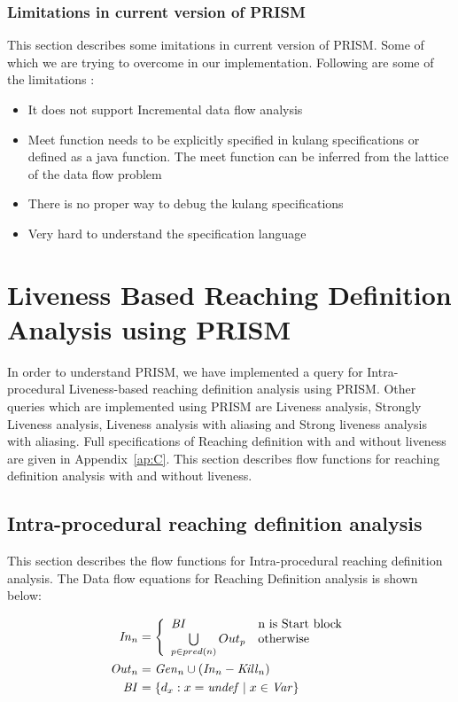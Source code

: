 \documentclass[11pt,a4paper,openright]{report}
\begin{document}
\subsection{Limitations in current version of PRISM}
This section describes some imitations in current version of PRISM. Some of which we are trying to overcome in our implementation.
Following are some of the limitations :
\begin{itemize}
 \item It does not support Incremental data flow analysis
 \item Meet function needs to be explicitly specified in kulang specifications or defined as a java function. The meet function can be inferred from
the lattice of the data flow problem
\item There is no proper way to debug the kulang specifications
 \item Very hard to understand the specification language

\end{itemize}

\chapter{Liveness Based Reaching Definition Analysis using PRISM}

In order to understand PRISM, we have implemented a query for Intra-procedural Liveness-based reaching definition analysis using PRISM. Other queries which are 
implemented using PRISM are Liveness analysis, Strongly Liveness analysis, Liveness analysis with aliasing and Strong liveness analysis with aliasing.
Full specifications of Reaching definition with and without liveness are given in Appendix~\ref{ap:C}. This section describes flow functions for reaching definition analysis with and without
liveness.

\section{Intra-procedural reaching definition analysis}
This section describes the flow functions for Intra-procedural reaching definition analysis.
The Data flow equations for Reaching Definition analysis is shown below:

\begin{equation}
\begin{split}
\mbox{\textit{In}}_n &= \left\{ \begin{array}{ll}
	  \mbox{\textit{BI}} & \mbox{n is Start block}\\
	  \bigcup\limits_{p \in pred(n)} Out_p & \mbox{otherwise}
	  \end{array} \right.\\ 
\mbox{\textit{Out}}_n &= \mbox{\textit{Gen}}_n \cup (\mbox{\textit{In}}_n - \mbox{\textit{Kill}}_n) \\
\mbox{\textit{BI}} &= \{d_x : x = \mbox{\textit{undef}} \mid x \in \mbox{\textit{Var}}\} \\
\end{split} 
\end{equation}
  
\end{document}
